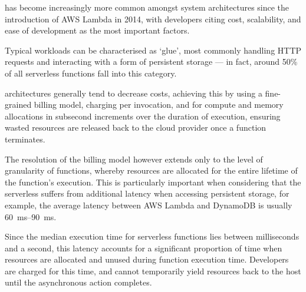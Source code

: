 \documentclass[a4paper,twocolumn]{article}
\begin{document}
\faaslong{} has become increasingly more common amongst system architectures since the introduction of AWS Lambda\cite{aws-lambda} in 2014, with developers citing cost, scalability, and ease of development as the most important factors\cite{review-of-serverless-use-cases-and-characteristics}.

Typical \faas{} workloads can be characterised as `glue', most commonly handling HTTP requests and interacting with a form of persistent storage --- in fact, around 50\% of all serverless functions fall into this category\cite{review-of-serverless-use-cases-and-characteristics}.

\faas{} architectures generally tend to decrease costs, achieving this by using a fine-grained billing model, charging per invocation, and for compute and memory allocations in subsecond increments over the duration of execution, ensuring wasted resources are released back to the cloud provider once a function terminates.

The resolution of the billing model however extends only to the level of granularity of functions, whereby resources are allocated for the entire lifetime of the function's execution. This is particularly important when considering that the serverless suffers from additional latency when accessing persistent storage, for example, the average latency between AWS Lambda and DynamoDB is usually \qtyrange{60}{90}{\ms}\cite{caching-techniques-improve-latency-serverless}.

Since the median execution time for serverless functions lies between milliseconds and a second\cite{review-of-serverless-use-cases-and-characteristics}, this latency accounts for a significant proportion of time when resources are allocated and unused during function execution time. Developers are charged for this time, and cannot temporarily yield resources back to the host until the asynchronous action completes.

\prntlen{\columnwidth}

\printbibliography
\end{document}
